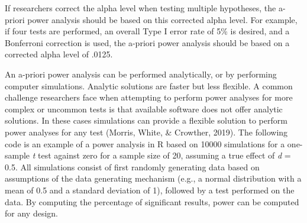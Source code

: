 \documentclass[
  english,
  ,jou,floatsintext]{apa6}
\newenvironment{Shaded}{\begin{snugshade}}{\end{snugshade}}
\newcommand{\AttributeTok}[1]{\textcolor[rgb]{0.77,0.63,0.00}{#1}}
\newcommand{\CommentTok}[1]{\textcolor[rgb]{0.56,0.35,0.01}{\textit{#1}}}
\newcommand{\ControlFlowTok}[1]{\textcolor[rgb]{0.13,0.29,0.53}{\textbf{#1}}}
\newcommand{\DecValTok}[1]{\textcolor[rgb]{0.00,0.00,0.81}{#1}}
\newcommand{\FloatTok}[1]{\textcolor[rgb]{0.00,0.00,0.81}{#1}}
\newcommand{\FunctionTok}[1]{\textcolor[rgb]{0.00,0.00,0.00}{#1}}
\newcommand{\NormalTok}[1]{#1}
\newcommand{\OtherTok}[1]{\textcolor[rgb]{0.56,0.35,0.01}{#1}}
\newcommand{\SpecialCharTok}[1]{\textcolor[rgb]{0.00,0.00,0.00}{#1}}
\begin{document}
If researchers correct the alpha level when testing multiple hypotheses, the a-priori power analysis should be based on this corrected alpha level. For example, if four tests are performed, an overall Type I error rate of 5\% is desired, and a Bonferroni correction is used, the a-priori power analysis should be based on a corrected alpha level of .0125.

An a-priori power analysis can be performed analytically, or by performing computer simulations. Analytic solutions are faster but less flexible. A common challenge researchers face when attempting to perform power analyses for more complex or uncommon tests is that available software does not offer analytic solutions. In these cases simulations can provide a flexible solution to perform power analyses for any test (Morris, White, \& Crowther, 2019). The following code is an example of a power analysis in R based on 10000 simulations for a one-sample \emph{t} test against zero for a sample size of 20, assuming a true effect of \emph{d} = 0.5. All simulations consist of first randomly generating data based on assumptions of the data generating mechanism (e.g., a normal distribution with a mean of 0.5 and a standard deviation of 1), followed by a test performed on the data. By computing the percentage of significant results, power can be computed for any design.

\begin{Shaded}
\end{Shaded}
\end{document}
